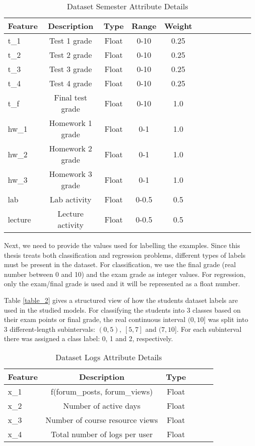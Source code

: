 \begin{table}[ht]
\centering
\begin{tabular}{l*{10}{c}r}
\toprule
Feature            & Description & Type & Range & Weight \\
\hline
t\_1               & Test 1 grade & Float & 0-10 & 0.25 \\
t\_2               & Test 2 grade & Float & 0-10 & 0.25 \\
t\_3               & Test 3 grade & Float & 0-10 & 0.25 \\
t\_4               & Test 4 grade & Float & 0-10 & 0.25 \\
t\_f               & Final test grade & Float & 0-10 & 1.0 \\
hw\_1              & Homework 1 grade & Float & 0-1 & 1.0 \\
hw\_2              & Homework 2 grade & Float & 0-1 & 1.0 \\
hw\_3              & Homework 3 grade & Float & 0-1 & 1.0 \\
lab                & Lab activity & Float & 0-0.5 & 0.5 \\
lecture            & Lecture activity & Float & 0-0.5 & 0.5 \\
\bottomrule
\end{tabular}
\caption[Dataset Details]{Dataset Semester Attribute Details}
\label{table_1}
\end{table}

Next, we need to provide the values used for labelling the examples. Since this 
thesis treats both classification and regression problems, different types of 
labels must be present in the dataset. For classification, we use the final 
grade (real number between 0 and 10) and the exam grade as integer values. For 
regression, only the exam/final grade is used and it will be represented as 
a float number. 

Table \ref{table_2} gives a structured view of how the 
students dataset labels are used in the studied models. For classifying the students 
into 3 classes based on their exam points or final 
grade, the real continuous interval $(0, 10]$ was split into 3 different-length subintervals: 
$(0, 5),\ [5, 7]$ and $(7, 10]$. 
For each subinterval there was assigned a class label: 0, 1 and 2, respectively. 

\begin{table}[ht]
\centering
\begin{tabular}{l*{4}{c}r}
\toprule
Feature            & Description & Type \\
\hline
x\_1               & f(forum\_posts, forum\_views) & Float \\
x\_2               & Number of active days & Float \\
x\_3               & Number of course resource views & Float \\
x\_4               & Total number of logs per user & Float \\
\bottomrule
\end{tabular}
\caption[Logs Dataset Details]{Dataset Logs Attribute Details}
\label{table_logs}
\end{table}


